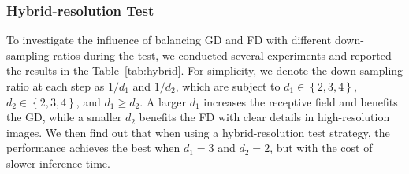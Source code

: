 \documentclass[twocolumn]{svjour3}
\begin{document}
\begin{table}[htbp]
\caption{Grid search results of the down-sampling ratio during test in GFM on AM-2k.}
\begin{center}
\end{center}
\label{tab:hybrid}
\end{table}


\subsubsection{Hybrid-resolution Test}

To investigate the influence of balancing GD and FD with different down-sampling ratios during the test, we conducted several experiments and reported the results in the Table~\ref{tab:hybrid}. For simplicity, we denote the down-sampling ratio at each step as $1/d_1$ and $1/d_2$, which are subject to $d_1\in\left \{ 2, 3, 4\right \}$, $d_2\in\left \{ 2, 3, 4\right \}$, and $d_1\geq d_2$. A larger $d_1$ increases the receptive field and benefits the GD, while a smaller $d_2$ benefits the FD with clear details in high-resolution images. We then find out that when using a hybrid-resolution test strategy, the performance achieves the best when $d_1=3$ and $d_2=2$, but with the cost of slower inference time. 
\end{document}
